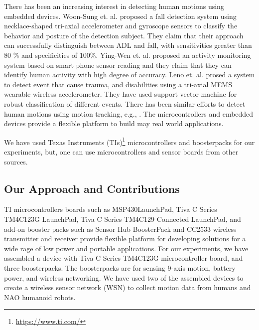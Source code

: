\documentclass[letterpaper]{article}
\begin{document}
There has been an increasing interest in detecting human motions using embedded devices. Woon-Sung
et. al. \cite{baek2013real} proposed  a fall  detection  system  using necklace-shaped tri-axial
accelerometer  and  gyroscope  sensors  to  classify  the  behavior  and  posture  of  the detection
 subject. They claim that their  approach  can  successfully  distinguish between  ADL and  fall, 
with  sensitivities  greater  than  80 \%  and specificities  of  100\%. Ying-Wen et. al.
\cite{bai2013recognition} proposed an activity monitoring system based on smart phone sensor
reading and they claim that they can identify human activity with high degree of accuracy. Leno et.
al. \cite{leone2013supervised} prosed a system to detect event that cause trauma, and disabilities
using a tri-axial MEMS wearable wireless accelerometer. They have used support vector machine for
robust classification of different events. There has been similar efforts to detect human motions
using motion tracking, e.g., \cite{dumitrache2013fall,kumarwearable,liang2012pre}. The 
microcontrollers and embedded devices provide a flexible platform to build may 
real world applications. 

We have used Texas Instruments (TIs)\footnote{\url{https://www.ti.com/}} 
 microcontrollers and boosterpacks for our 
experiments, but, one can use microcontrollers and sensor boards from other sources.  



\subsection{Our Approach and Contributions}

TI microcontrollers  boards such 
as MSP430{\texttrademark}LaunchPad, Tiva{\texttrademark} C Series TM4C123G
LaunchPad, Tiva C Series 
TM4C129 Connected LaunchPad, and add-on booster packs such as Sensor Hub BoosterPack and CC2533 
wireless transmitter and 
receiver  provide flexible platform for developing solutions for a wide rage of low power 
and portable applications. For our experiments, we have assembled a device with Tiva C Series 
TM4C123G microcontroller board, and three boosterpacks. The boosterpacks are for sensing 9-axis 
motion, battery power, and wireless networking. We have used two of the assembled devices to create 
a wireless sensor network (WSN) to collect motion data from  humans and NAO humanoid robots.   
\end{document}
